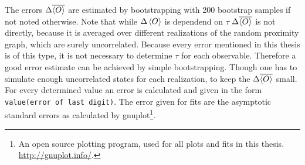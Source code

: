 The errors \(\Delta \overline{\left< O \right>}\) are estimated by bootstrapping
\cite{Bootstrap} with 200 bootstrap samples if not noted otherwise.
Note that while \(\Delta \left< O \right>\) is dependend on \(\tau\) \cite[p. 151]{Katzgraber2011}
\(\Delta \overline{\left< O \right>}\) is not directly, because it is averaged
over different realizations of the random proximity graph, which are
surely uncorrelated.
Because every error mentioned in this thesis is of this type, it is not
necessary to determine \(\tau\) for each observable. Therefore a good
error estimate can be achieved by simple bootstrapping. Though one has
to simulate enough uncorrelated states for each realization, to keep
the \(\Delta \overline{\left< O \right>}\) small. For every determined value an
error is calculated and given in the form \texttt{value(error of last digit)}.
The error given for fits are the asymptotic standard errors as calculated
by gnuplot\footnote{An open source plotting program, used for all plots and fits in this thesis. \url{http://gnuplot.info/}.}.

